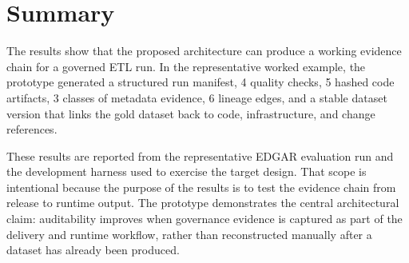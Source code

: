 \section{Summary}
\noindent
The results show that the proposed architecture can produce a working evidence
chain for a governed ETL run. In the representative worked example, the
prototype generated a structured run manifest, 4 quality checks, 5 hashed code
artifacts, 3 classes of metadata evidence, 6 lineage edges, and a stable
dataset version that links the gold dataset back to code, infrastructure, and
change references.

These results are reported from the representative EDGAR evaluation run and the
development harness used to exercise the target design. That scope is
intentional because the purpose of the results is to test the evidence chain
from release to runtime output. The prototype demonstrates the central
architectural claim: auditability improves when governance evidence is captured
as part of the delivery and runtime workflow, rather than reconstructed manually
after a dataset has already been produced.
